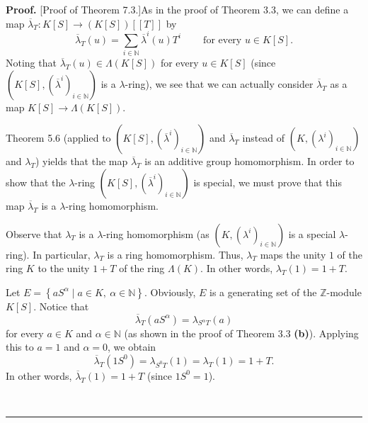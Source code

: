 \documentclass[numbers=enddot,12pt,final,onecolumn,notitlepage]{scrartcl}%
\newenvironment{proof}[1][Proof]{\noindent\textbf{#1.} }{\ \rule{0.5em}{0.5em}}
\begin{document}
\begin{proof}
[Proof of Theorem 7.3.]As in the proof of Theorem 3.3, we can define a map
$\overline{\lambda}_{T}:K\left[  S\right]  \rightarrow\left(  K\left[
S\right]  \right)  \left[  \left[  T\right]  \right]  $ by
\[
\overline{\lambda}_{T}\left(  u\right)  =\sum\limits_{i\in\mathbb{N}}%
\overline{\lambda}^{i}\left(  u\right)  T^{i}\ \ \ \ \ \ \ \ \ \ \text{for
every }u\in K\left[  S\right]  .
\]
Noting that $\overline{\lambda}_{T}\left(  u\right)  \in\Lambda\left(
K\left[  S\right]  \right)  $ for every $u\in K\left[  S\right]  $ (since
$\left(  K\left[  S\right]  ,\left(  \overline{\lambda}^{i}\right)
_{i\in\mathbb{N}}\right)  $ is a $\lambda$-ring), we see that we can actually
consider $\overline{\lambda}_{T}$ as a map $K\left[  S\right]  \rightarrow
\Lambda\left(  K\left[  S\right]  \right)  $.

Theorem 5.6 (applied to $\left(  K\left[  S\right]  ,\left(  \overline
{\lambda}^{i}\right)  _{i\in\mathbb{N}}\right)  $ and $\overline{\lambda}_{T}$
instead of $\left(  K,\left(  \lambda^{i}\right)  _{i\in\mathbb{N}}\right)  $
and $\lambda_{T}$) yields that the map $\overline{\lambda}_{T}$ is an additive
group homomorphism. In order to show that the $\lambda$-ring $\left(  K\left[
S\right]  ,\left(  \overline{\lambda}^{i}\right)  _{i\in\mathbb{N}}\right)  $
is special, we must prove that this map $\overline{\lambda}_{T}$ is a
$\lambda$-ring homomorphism.

Observe that $\lambda_{T}$ is a $\lambda$-ring homomorphism (as $\left(
K,\left(  \lambda^{i}\right)  _{i\in\mathbb{N}}\right)  $ is a special
$\lambda$-ring). In particular, $\lambda_{T}$ is a ring homomorphism. Thus,
$\lambda_{T}$ maps the unity $1$ of the ring $K$ to the unity $1+T$ of the
ring $\Lambda\left(  K\right)  $. In other words, $\lambda_{T}\left(
1\right)  =1+T$.

Let $E=\left\{  aS^{\alpha}\mid a\in K,\ \alpha\in\mathbb{N}\right\}  $.
Obviously, $E$ is a generating set of the $\mathbb{Z}$-module $K\left[
S\right]  $. Notice that%
\begin{equation}
\overline{\lambda}_{T}\left(  aS^{\alpha}\right)  =\lambda_{S^{\alpha}%
T}\left(  a\right)  \label{pf.7.3.1}%
\end{equation}
for every $a\in K$ and $\alpha\in\mathbb{N}$ (as shown in the proof of Theorem
3.3 \textbf{(b)}). Applying this to $a=1$ and $\alpha=0$, we obtain%
\[
\overline{\lambda}_{T}\left(  1S^{0}\right)  =\lambda_{S^{0}T}\left(
1\right)  =\lambda_{T}\left(  1\right)  =1+T.
\]
In other words, $\overline{\lambda}_{T}\left(  1\right)  =1+T$ (since
$1S^{0}=1$).


\end{proof}
\end{document}
